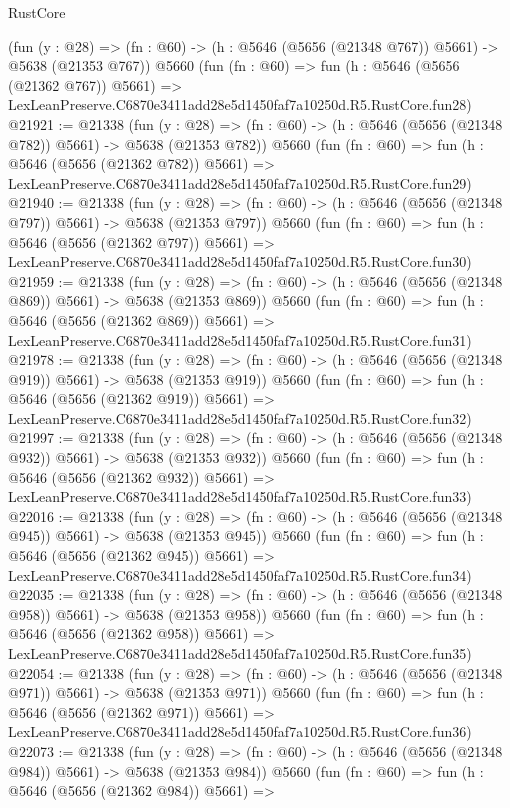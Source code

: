 \begin{lexlean}{RustCore}
\begin{coremodule}
    (fun (y : @28) => (fn : @60) -> (h : @5646 (@5656 (@21348 @767)) @5661) -> @5638 (@21353 @767))
    @5660
    (fun (fn : @60) =>
    fun (h : @5646 (@5656 (@21362 @767)) @5661) =>
    LexLeanPreserve.C6870e3411add28e5d1450faf7a10250d.R5.RustCore.fun28)
@21921 := @21338
    (fun (y : @28) => (fn : @60) -> (h : @5646 (@5656 (@21348 @782)) @5661) -> @5638 (@21353 @782))
    @5660
    (fun (fn : @60) =>
    fun (h : @5646 (@5656 (@21362 @782)) @5661) =>
    LexLeanPreserve.C6870e3411add28e5d1450faf7a10250d.R5.RustCore.fun29)
@21940 := @21338
    (fun (y : @28) => (fn : @60) -> (h : @5646 (@5656 (@21348 @797)) @5661) -> @5638 (@21353 @797))
    @5660
    (fun (fn : @60) =>
    fun (h : @5646 (@5656 (@21362 @797)) @5661) =>
    LexLeanPreserve.C6870e3411add28e5d1450faf7a10250d.R5.RustCore.fun30)
@21959 := @21338
    (fun (y : @28) => (fn : @60) -> (h : @5646 (@5656 (@21348 @869)) @5661) -> @5638 (@21353 @869))
    @5660
    (fun (fn : @60) =>
    fun (h : @5646 (@5656 (@21362 @869)) @5661) =>
    LexLeanPreserve.C6870e3411add28e5d1450faf7a10250d.R5.RustCore.fun31)
@21978 := @21338
    (fun (y : @28) => (fn : @60) -> (h : @5646 (@5656 (@21348 @919)) @5661) -> @5638 (@21353 @919))
    @5660
    (fun (fn : @60) =>
    fun (h : @5646 (@5656 (@21362 @919)) @5661) =>
    LexLeanPreserve.C6870e3411add28e5d1450faf7a10250d.R5.RustCore.fun32)
@21997 := @21338
    (fun (y : @28) => (fn : @60) -> (h : @5646 (@5656 (@21348 @932)) @5661) -> @5638 (@21353 @932))
    @5660
    (fun (fn : @60) =>
    fun (h : @5646 (@5656 (@21362 @932)) @5661) =>
    LexLeanPreserve.C6870e3411add28e5d1450faf7a10250d.R5.RustCore.fun33)
@22016 := @21338
    (fun (y : @28) => (fn : @60) -> (h : @5646 (@5656 (@21348 @945)) @5661) -> @5638 (@21353 @945))
    @5660
    (fun (fn : @60) =>
    fun (h : @5646 (@5656 (@21362 @945)) @5661) =>
    LexLeanPreserve.C6870e3411add28e5d1450faf7a10250d.R5.RustCore.fun34)
@22035 := @21338
    (fun (y : @28) => (fn : @60) -> (h : @5646 (@5656 (@21348 @958)) @5661) -> @5638 (@21353 @958))
    @5660
    (fun (fn : @60) =>
    fun (h : @5646 (@5656 (@21362 @958)) @5661) =>
    LexLeanPreserve.C6870e3411add28e5d1450faf7a10250d.R5.RustCore.fun35)
@22054 := @21338
    (fun (y : @28) => (fn : @60) -> (h : @5646 (@5656 (@21348 @971)) @5661) -> @5638 (@21353 @971))
    @5660
    (fun (fn : @60) =>
    fun (h : @5646 (@5656 (@21362 @971)) @5661) =>
    LexLeanPreserve.C6870e3411add28e5d1450faf7a10250d.R5.RustCore.fun36)
@22073 := @21338
    (fun (y : @28) => (fn : @60) -> (h : @5646 (@5656 (@21348 @984)) @5661) -> @5638 (@21353 @984))
    @5660
    (fun (fn : @60) =>
    fun (h : @5646 (@5656 (@21362 @984)) @5661) =>

\end{coremodule}
\end{lexlean}
